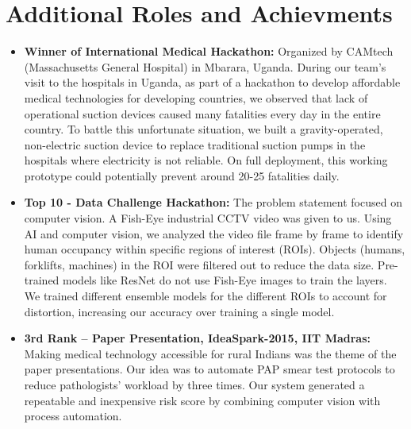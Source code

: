 \documentclass{ExpressiveResume}
\begin{document}
\section{\textcolor{link_blue}{Additional Roles and Achievments}}
\begin{itemize}

\item {\textbf{\textcolor{link_blue}{Winner} of International Medical Hackathon:} Organized by CAMtech (Massachusetts General Hospital) in Mbarara, Uganda. During our team’s visit to the hospitals in Uganda, as part of a hackathon to develop affordable medical technologies for developing countries, we observed that lack of operational suction devices caused many fatalities every day in the entire country. To battle this unfortunate situation, we built a gravity-operated, non-electric suction device to replace traditional suction pumps in the hospitals where electricity is not reliable. On full deployment, this working prototype could potentially prevent around 20-25 fatalities daily.}
\item {\textbf{Top 10 - Data Challenge Hackathon:} The problem statement focused on computer vision. A Fish-Eye industrial CCTV video was given to us. Using AI and computer vision, we analyzed the video file frame by frame to identify human occupancy within specific regions of interest (ROIs). Objects (humans, forklifts, machines) in the ROI were filtered out to reduce the data size. Pre-trained models like ResNet do not use Fish-Eye images to train the layers. We trained different ensemble models for the different ROIs to account for distortion, increasing our accuracy over training a single model.}

\item {\textbf{\textcolor{link_blue}{3rd Rank} – Paper Presentation, IdeaSpark-2015, IIT Madras:} Making medical technology accessible for rural Indians was the theme of the paper presentations. Our idea was to automate PAP smear test protocols to reduce pathologists' workload by three times. Our system generated a repeatable and inexpensive risk score by combining computer vision with process automation.}


\end{itemize}
\end{document}
